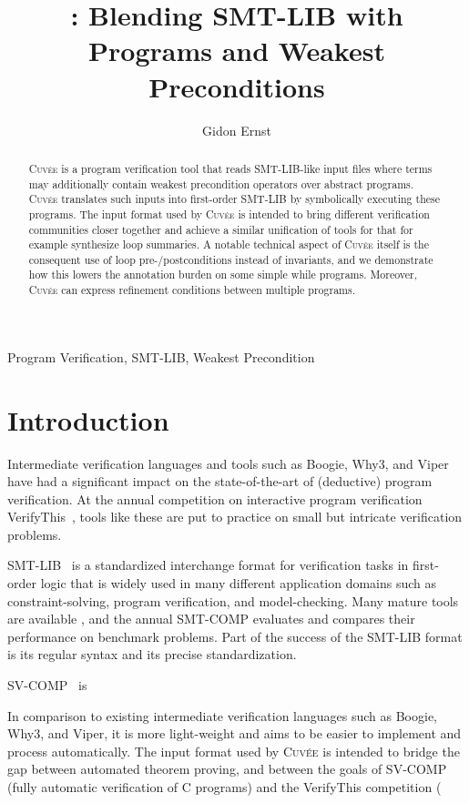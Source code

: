 \documentclass[fleqn]{llncs}
\title{\Cuvee: Blending SMT-LIB with \\ Programs and Weakest Preconditions}
\author{Gidon Ernst}
\institute{LMU Munich, Germany, \email{gidon.ernst@lmu.de}}
\newcommand{\Cuvee}{\textsc{Cuvée}\xspace}
\begin{document}
\maketitle

\begin{abstract}
\Cuvee is a program verification tool that reads SMT-LIB-like input files where terms may additionally contain weakest precondition operators over abstract programs.
\Cuvee translates such inputs into first-order SMT-LIB by symbolically executing these programs.
The input format used by \Cuvee is intended to bring different verification communities closer together and achieve a similar unification of tools for that for example synthesize loop summaries.
A notable technical aspect of \Cuvee itself is the consequent use of loop pre-/postconditions instead of invariants, and we demonstrate how this lowers the annotation burden on some simple while programs.
Moreover, \Cuvee can express refinement conditions between multiple programs.
\end{abstract}

\begin{keywords}
Program Verification, SMT-LIB, Weakest Precondition
\end{keywords}

\section{Introduction}

Intermediate verification languages and tools such as Boogie, Why3, and Viper
have had a significant impact on the state-of-the-art of (deductive) program verification.
At the annual competition on interactive program verification VerifyThis~\cite{},
tools like these are put to practice on small but intricate verification problems.

SMT-LIB~\cite{} is a standardized interchange format for verification tasks in first-order logic
that is widely used in many different application domains such as constraint-solving, program verification, and model-checking.
Many mature tools are available \cite{}, and the annual SMT-COMP evaluates and compares their performance on benchmark problems.
Part of the success of the SMT-LIB format is its regular syntax and its precise standardization.

SV-COMP~\cite{} is 


In comparison to existing intermediate verification languages such as Boogie, Why3, and Viper,
it is more light-weight and aims to be easier to implement and process automatically.
The input format used by \Cuvee is intended to bridge the gap between automated theorem proving,
and between the goals of SV-COMP (fully automatic verification of C programs)
and the VerifyThis competition (
\end{document}
